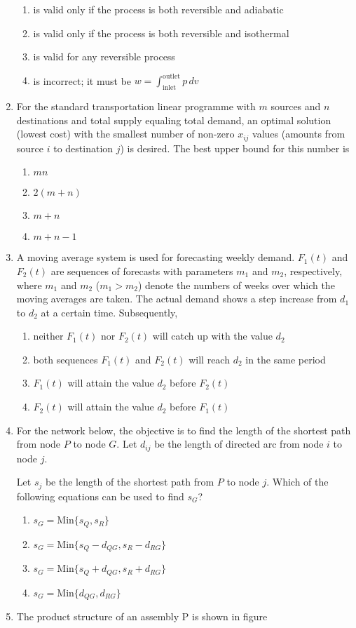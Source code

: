 \documentclass[journal]{IEEEtran}
\numberwithin{equation}{enumi}
\numberwithin{figure}{enumi}
\begin{document}
\begin{enumerate}
\begin{enumerate}
    \item is valid only if the process is both reversible and adiabatic
    \item is valid only if the process is both reversible and isothermal
    \item is valid for any reversible process
    \item is incorrect; it must be $w=\int_{\text{inlet}}^{\text{outlet}} p \, dv $
\end{enumerate}
\item For the standard transportation linear programme with $m$ sources and $n$ destinations and total supply equaling total demand, an optimal solution (lowest cost) with the smallest number of non-zero $x_{ij}$ values (amounts from source $i$ to destination $j$) is desired. The best upper bound for this number is
\hfill{}
\begin{enumerate}
    \item $mn$
    \item $2(m + n)$
    \item $m + n$
    \item $m + n - 1$
\end{enumerate}
\item A moving average system is used for forecasting weekly demand. $F_1(t)$ and $F_2(t)$ are sequences of forecasts with parameters $m_1$ and $m_2$, respectively, where $m_1$ and $m_2$ ($m_1 > m_2$) denote the numbers of weeks over which the moving averages are taken. The actual demand shows a step increase from $d_1$ to $d_2$ at a certain time. Subsequently,
\hfill{}
\begin{enumerate}
    \item neither $F_1(t)$ nor $F_2(t)$ will catch up with the value $d_2$
    \item both sequences $F_1(t)$ and $F_2(t)$ will reach $d_2$ in the same period
    \item $F_1(t)$ will attain the value $d_2$ before $F_2(t)$
    \item $F_2(t)$ will attain the value $d_2$ before $F_1(t)$
\end{enumerate}
\item For the network below, the objective is to find the length of the shortest path from node $P$ to node $G$. Let $d_{ij}$ be the length of directed arc from node $i$ to node $j$.


Let $s_j$ be the length of the shortest path from $P$ to node $j$. Which of the following equations can be used to find $s_G$?
\hfill{}
\begin{enumerate}
    \item $s_G = \text{Min}\{s_Q, s_R\}$
    \item $s_G = \text{Min}\{s_Q - d_{QG}, s_R - d_{RG}\}$
    \item $s_G = \text{Min}\{s_Q + d_{QG}, s_R + d_{RG}\}$
    \item $s_G = \text{Min}\{d_{QG}, d_{RG}\}$
\end{enumerate}
\item The product structure of an assembly P is shown in figure 


\end{enumerate}
\end{document}
